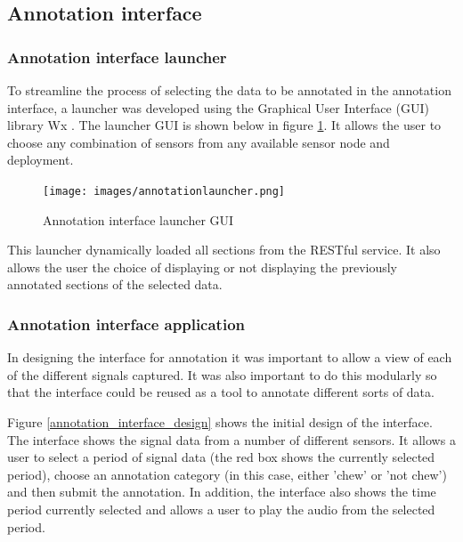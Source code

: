 \subsection{Annotation interface}


\subsubsection{Annotation interface launcher}

To streamline the process of selecting the data to be annotated in the annotation interface, a launcher was developed using the Graphical User Interface (GUI) library Wx \cite{rappin2006wxpython}. The launcher GUI is shown below in figure \ref{launcherpic}. It allows the user to choose any combination of sensors from any available sensor node and deployment. 

\begin{figure}[ht!]
\begin{center}
\leavevmode
\texttt{[image: images/annotationlauncher.png]}
\end{center}
\caption{Annotation interface launcher GUI}
\label{launcherpic}
\end{figure}

This launcher dynamically loaded all sections from the RESTful service. It also allows the user the choice of displaying or not displaying the previously annotated sections of the selected data. 

\subsubsection{Annotation interface application}

In designing the interface for annotation it was important to allow a view of each of the different signals captured. It was also important to do this modularly so that the interface could be reused as a tool to annotate different sorts of data.

Figure \ref{annotation_interface_design} shows the initial design of the interface. The interface shows the signal data from a number of different sensors. It allows a user to select a period of signal data (the red box shows the currently selected period), choose an annotation category (in this case, either 'chew' or 'not chew') and then submit the annotation. In addition, the interface also shows the time period currently selected and allows a user to play the audio from the selected period. 

